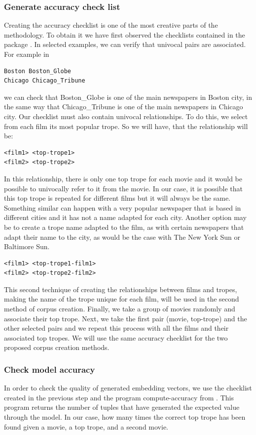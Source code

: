 \documentclass[letterpaper]{article}
\begin{document}
 \subsubsection{Generate accuracy check list}
Creating the accuracy checklist is one of the most creative parts of the methodology. To obtain it we have first observed the checklists contained in the package \cite{git-hub-word2vec}. In selected examples, we can verify that univocal pairs are associated. For example in 
\begin{verbatim}
Boston Boston_Globe 
Chicago Chicago_Tribune
\end{verbatim}
we can check that 
Boston\_Globe is one of the main newspapers in Boston city, in the same way that Chicago\_Tribune is one of the main newspapers in Chicago city. Our checklist must also contain univocal relationships. To do this, we select from each film its most popular trope. So we will have, that the relationship will be:

\begin{verbatim}
<film1> <top-trope1> 
<film2> <top-trope2>
\end{verbatim}

In this relationship, there is only one top trope for each movie and it would be possible to univocally refer to it from the movie. In our case, it is possible that this top trope is repeated for different films but it will always be the same. Something similar can happen with a very popular newspaper that is based in different cities and it has not a name adapted for each city. Another option may be to create a trope name adapted to the film, as with certain newspapers that adapt their name to the city, as would be the case with The New York Sun or Baltimore Sun. 
\begin{verbatim}
<film1> <top-trope1-film1> 
<film2> <top-trope2-film2>
\end{verbatim}
	
 This second technique of creating the relationships between films and tropes, making the name of the trope unique for each film, will be used in the second method of corpus creation. Finally, we take a group of movies randomly and associate their top trope. Next, we take the first pair (movie, top-trope) and the other selected pairs and we repeat this process with all the films and their associated top tropes. We will use the same accuracy checklist for the two proposed corpus creation methods.   


\subsubsection{Check model accuracy}
In order to check the quality of generated embedding vectors, we use the checklist created in the previous step and the program compute-accuracy from \cite{git-hub-word2vec}. This program returns the number of tuples that have generated the expected value through the model. In our case, how many times the correct top trope has been found given a movie, a top trope, and a second movie.
\end{document}
